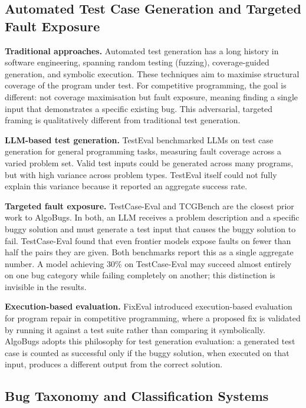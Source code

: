 \subsection{Automated Test Case Generation and Targeted Fault Exposure}

\textbf{Traditional approaches.} Automated test generation has a long history in software engineering, spanning random testing (fuzzing), coverage-guided generation, and symbolic execution. These techniques aim to maximise structural coverage of the program under test. For competitive programming, the goal is different: not coverage maximisation but fault exposure, meaning finding a single input that demonstrates a specific existing bug. This adversarial, targeted framing is qualitatively different from traditional test generation.

\textbf{LLM-based test generation.} TestEval \cite{wang2025testeval} benchmarked LLMs on test case generation for general programming tasks, measuring fault coverage across a varied problem set. Valid test inputs could be generated across many programs, but with high variance across problem types. TestEval itself could not fully explain this variance because it reported an aggregate success rate.

\textbf{Targeted fault exposure.} TestCase-Eval \cite{yang2025testcase} and TCGBench \cite{cao2025tcgbench} are the closest prior work to AlgoBugs. In both, an LLM receives a problem description and a specific buggy solution and must generate a test input that causes the buggy solution to fail. TestCase-Eval found that even frontier models expose faults on fewer than half the pairs they are given. Both benchmarks report this as a single aggregate number. A model achieving 30\% on TestCase-Eval may succeed almost entirely on one bug category while failing completely on another; this distinction is invisible in the results.

\textbf{Execution-based evaluation.} FixEval \cite{haque2023fixeval} introduced execution-based evaluation for program repair in competitive programming, where a proposed fix is validated by running it against a test suite rather than comparing it symbolically. AlgoBugs adopts this philosophy for test generation evaluation: a generated test case is counted as successful only if the buggy solution, when executed on that input, produces a different output from the correct solution.

\subsection{Bug Taxonomy and Classification Systems}

